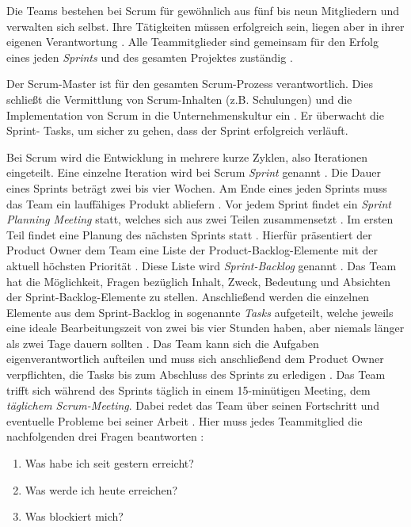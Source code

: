 Die Teams bestehen bei Scrum für gewöhnlich aus fünf bis neun Mitgliedern und verwalten sich selbst. Ihre Tätigkeiten müssen erfolgreich sein, liegen aber in ihrer eigenen Verantwortung \cite{Pries2011, Wolf2011}. Alle Teammitglieder sind gemeinsam für den Erfolg eines jeden \textit{Sprints} und des gesamten Projektes zuständig \cite{Pichler2010}. \newline

Der Scrum-Master ist für den gesamten Scrum-Prozess verantwortlich. Dies schließt die Vermittlung von Scrum-Inhalten (z.B. Schulungen) und die Implementation von Scrum in die Unternehmenskultur ein \cite{Pichler2010}. Er überwacht die Sprint- Tasks, um sicher zu gehen, dass der Sprint erfolgreich verläuft.\newline

Bei Scrum wird die Entwicklung in mehrere kurze Zyklen, also Iterationen eingeteilt. Eine einzelne Iteration wird bei Scrum \textit{Sprint} genannt \cite{Henning2011}. Die Dauer eines Sprints beträgt zwei bis vier Wochen. Am Ende eines jeden Sprints muss das Team ein lauffähiges Produkt abliefern \cite{Wolf2011}. Vor jedem Sprint findet ein \textit{Sprint Planning Meeting} statt, welches sich aus zwei Teilen zusammensetzt \cite{Pichler2010}. Im ersten Teil findet eine Planung des nächsten Sprints statt \cite{Lacey2012}. Hierfür präsentiert der Product Owner dem Team eine Liste der Product-Backlog-Elemente mit der aktuell höchsten Priorität \cite{Schwaber2004, Schwaber2007,Pichler2010}. Diese Liste wird \textit{Sprint-Backlog} genannt \cite{Wolf2011}. Das Team hat die Möglichkeit, Fragen bezüglich Inhalt, Zweck, Bedeutung und Absichten der Sprint-Backlog-Elemente zu stellen. Anschließend werden die einzelnen Elemente aus dem Sprint-Backlog in sogenannte \textit{Tasks} aufgeteilt, welche jeweils eine ideale Bearbeitungszeit von zwei bis vier Stunden haben, aber niemals länger als zwei Tage dauern sollten \cite{Wolf2011}. Das Team kann sich die Aufgaben eigenverantwortlich aufteilen und muss sich anschließend dem Product  Owner verpflichten, die Tasks bis zum Abschluss des Sprints zu erledigen \cite{Wolf2011, Keith2010,Pichler2010}.
Das Team trifft sich während des Sprints täglich in einem 15-minütigen Meeting, dem \textit{täglichem Scrum-Meeting}. Dabei redet das Team über seinen Fortschritt und eventuelle Probleme bei seiner Arbeit \cite{Keith2010}. Hier muss jedes Teammitglied die nachfolgenden drei Fragen beantworten \cite{Wolf2011}:
   \begin{enumerate}
      \item Was habe ich seit gestern erreicht?
      \item Was werde ich heute erreichen?
      \item Was blockiert mich?
      \end {enumerate}
      
